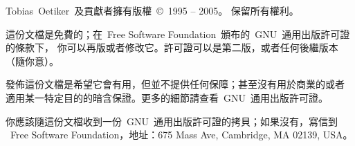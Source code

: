 \pagebreak
\begin{small}
   Tobias\ Oetiker~及貢獻者擁有版權~\copyright\ 1995 -- 2005。
   保留所有權利。

   這份文檔是免費的；在~Free Software Foundation~頒布的~GNU~通用出版許可證的條款下，
   你可以再版或者修改它。許可證可以是第二版，或者任何後繼版本（隨你意）。

   發佈這份文檔是希望它會有用，但並不提供任何保障；甚至沒有用於商業的或者
   適用某一特定目的的暗含保證。更多的細節請查看~GNU~通用出版許可證。

   你應該隨這份文檔收到一份~GNU~通用出版許可證的拷貝；如果沒有，寫信到
   ~Free Software Foundation，地址：675 Mass Ave, Cambridge, MA 02139, USA。

\end{small}


\endinput

%


